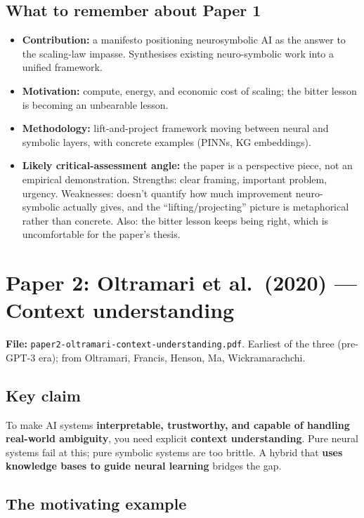 \documentclass[11pt, a4paper]{article}
\begin{document}
\subsection{What to remember about Paper 1}

\begin{itemize}
  \item \textbf{Contribution:} a manifesto positioning neurosymbolic AI as the answer to the scaling-law impasse. Synthesises existing neuro-symbolic work into a unified framework.
  \item \textbf{Motivation:} compute, energy, and economic cost of scaling; the bitter lesson is becoming an unbearable lesson.
  \item \textbf{Methodology:} lift-and-project framework moving between neural and symbolic layers, with concrete examples (PINNs, KG embeddings).
  \item \textbf{Likely critical-assessment angle:} the paper is a perspective piece, not an empirical demonstration. Strengths: clear framing, important problem, urgency. Weaknesses: doesn't quantify how much improvement neuro-symbolic actually gives, and the ``lifting/projecting'' picture is metaphorical rather than concrete. Also: the bitter lesson keeps being right, which is uncomfortable for the paper's thesis.
\end{itemize}

\section{Paper 2: Oltramari et al.\ (2020) — Context understanding}

\textbf{File:} \texttt{paper2-oltramari-context-understanding.pdf}. Earliest of the three (pre-GPT-3 era); from Oltramari, Francis, Henson, Ma, Wickramarachchi.

\subsection{Key claim}

To make AI systems \textbf{interpretable, trustworthy, and capable of handling real-world ambiguity}, you need explicit \textbf{context understanding}. Pure neural systems fail at this; pure symbolic systems are too brittle. A hybrid that \textbf{uses knowledge bases to guide neural learning} bridges the gap.

\subsection{The motivating example}
\end{document}
